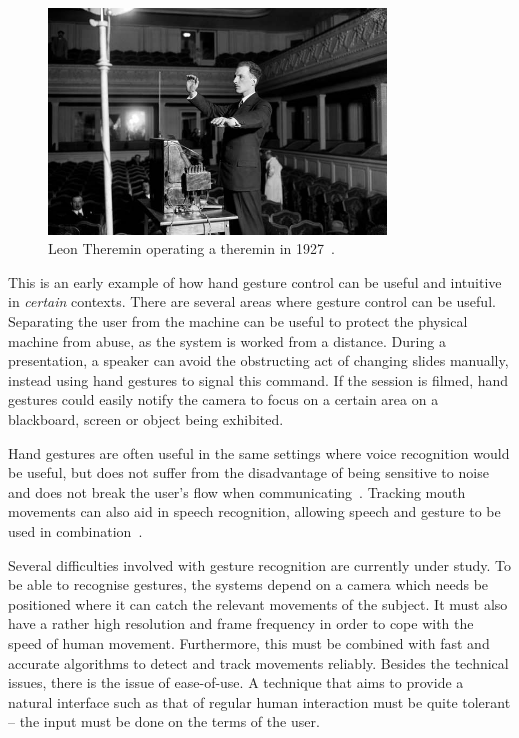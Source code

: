 \begin{figure}[]
\includegraphics[width=0.8\textwidth] {bilder/teremin.jpg}
\caption{Leon Theremin operating a theremin in 1927~\cite{theremin}.}
\label{theremin}
\end{figure}

This is an early example of how hand gesture control can be useful and intuitive in \emph{certain} contexts. There are several areas where gesture control can be useful. Separating the user from the machine can be useful to protect the physical machine from abuse, as the system is worked from a distance. During a presentation, a speaker can avoid the obstructing act of changing slides manually, instead using hand gestures to signal this command. If the session is filmed, hand gestures could easily notify the camera to focus on a certain area on a blackboard, screen or object being exhibited.

Hand gestures are often useful in the same settings where voice recognition would be useful, but does not suffer from the disadvantage of being sensitive to noise and does not break the user's flow when communicating~\cite{Hardenberg01bare-handhuman-computer}. Tracking mouth movements can also aid in speech recognition, allowing speech and gesture to be used in combination~\cite{conf/icmcs/LiuK10, conf/icmcs/SarginAKOYWEYT06}.

Several difficulties involved with gesture recognition are currently under study. To be able to recognise gestures, the systems depend on a camera which needs be positioned where it can catch the relevant movements of the subject. It must also have a rather high resolution and frame frequency in order to cope with the speed of human movement. Furthermore, this must be combined with fast and accurate algorithms to detect and track movements reliably. Besides the technical issues, there is the issue of ease-of-use. A technique that aims to provide a natural interface such as that of regular human interaction must be quite tolerant -- the input must be done on the terms of the user. 

